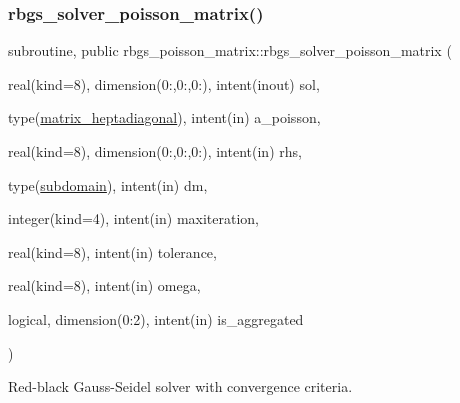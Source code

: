 \subsubsection{\texorpdfstring{rbgs\+\_\+solver\+\_\+poisson\+\_\+matrix()}{rbgs\_solver\_poisson\_matrix()}}
{\footnotesize\ttfamily subroutine, public rbgs\+\_\+poisson\+\_\+matrix\+::rbgs\+\_\+solver\+\_\+poisson\+\_\+matrix (\begin{DoxyParamCaption}\item[{real(kind=8), dimension(0\+:,0\+:,0\+:), intent(inout)}]{sol,  }\item[{type(\hyperlink{structmatrix_1_1matrix__heptadiagonal}{matrix\+\_\+heptadiagonal}), intent(in)}]{a\+\_\+poisson,  }\item[{real(kind=8), dimension(0\+:,0\+:,0\+:), intent(in)}]{rhs,  }\item[{type(\hyperlink{structgeometry_1_1subdomain}{subdomain}), intent(in)}]{dm,  }\item[{integer(kind=4), intent(in)}]{maxiteration,  }\item[{real(kind=8), intent(in)}]{tolerance,  }\item[{real(kind=8), intent(in)}]{omega,  }\item[{logical, dimension(0\+:2), intent(in)}]{is\+\_\+aggregated }\end{DoxyParamCaption})}



Red-\/black Gauss-\/\+Seidel solver with convergence criteria. 


